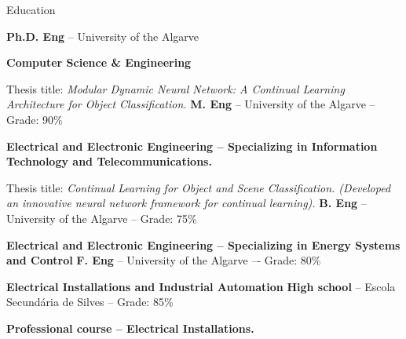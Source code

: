 \begin{rubric}{Education}


  \entry*[2021 -- Present]
  \textbf{Ph.D. Eng} -- University of the Algarve

  \vspace{0.1cm}
  \par \textbf{Computer Science \& Engineering}

  \par Thesis title: \emph{ Modular Dynamic Neural Network: A Continual Learning Architecture for Object
    Classification.}
  \vspace{0.15cm}
  \entry*[2018 -- 2020]
  \textbf{M. Eng} -- University of the Algarve -- Grade: 90\%

  \vspace{0.1cm}
  \par \textbf{Electrical and Electronic Engineering – Specializing in Information Technology and
    Telecommunications.}

  \par Thesis title: \emph{ Continual Learning for Object and Scene Classification. (Developed an innovative
    neural network framework for continual learning).}
  \vspace{0.15cm}
  \entry*[2015 -- 2018]
  \textbf{B. Eng} -- University of the Algarve -- Grade: 75\%

  \vspace{0.1cm}
  \par \textbf{Electrical and Electronic Engineering – Specializing in Energy Systems and Control}
  \vspace{0.15cm}
  \entry*[2013 -- 2015]
  \textbf{F. Eng} -- University of the Algarve –- Grade: 80\%

  \vspace{0.1cm}
  \par \textbf{Electrical Installations and Industrial Automation}
  \vspace{0.15cm}
  \entry*[2010 -- 2013]
  \textbf{High school} -- Escola Secundária de Silves – Grade: 85\%

  \vspace{0.2cm}
  \par \textbf{Professional course – Electrical Installations.}
\end{rubric}